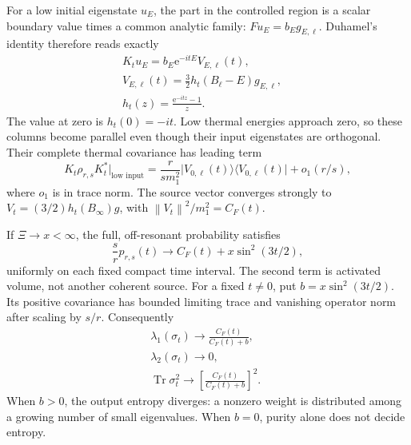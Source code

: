 \documentclass[aps,pra,reprint,superscriptaddress,longbibliography]{revtex4-2}
\newcommand{\Tr}{\operatorname{Tr}}
\newcommand{\ee}{\mathrm e}
\newcommand{\norm}[1]{\left\lVert#1\right\rVert}
\newcommand{\ket}[1]{\lvert#1\rangle}
\newcommand{\bra}[1]{\langle#1\rvert}
\begin{document}
For a low initial eigenstate $u_E$, the part in the controlled region
is a scalar boundary value times a common analytic family:
$Fu_E=b_Eg_{E,\ell}$. Duhamel's identity therefore reads exactly
\begin{equation}
 \begin{gathered}
 K_tu_E=b_E\ee^{-itE}V_{E,\ell}(t),\qquad\\
 V_{E,\ell}(t)=\frac32 h_t(B_\ell-E)g_{E,\ell},\quad\\
 h_t(z)=\frac{\ee^{-itz}-1}{z}.                 \label{eq:column}
 \end{gathered}
\end{equation}
The value at zero is $h_t(0)=-it$. Low thermal energies approach zero,
so these columns become parallel even though their input eigenstates
are orthogonal. Their complete thermal covariance has leading term
\begin{equation}
 K_t\rho_{r,s}K_t^*\big|_{\text{low input}}
 =\frac r{s m_1^2}\ket{V_{0,\ell}(t)}\bra{V_{0,\ell}(t)}
                       +o_1(r/s),                            \label{eq:covariance}
\end{equation}
where $o_1$ is in trace norm. The source vector converges strongly to
$V_t=(3/2)h_t(B_\infty)g$, with
$\norm{V_t}^2/m_1^2=C_F(t)$.

If $\Xi\to x<\infty$, the full, off-resonant probability satisfies
\begin{equation}
 \frac{s}{r}p_{r,s}(t)\longrightarrow
       C_F(t)+x\sin^2(3t/2),                                  \label{eq:timeyield}
\end{equation}
uniformly on each fixed compact time interval. The second term is
activated volume, not another coherent source. For a fixed $t\ne0$,
put $b=x\sin^2(3t/2)$. Its positive covariance has bounded limiting
trace and vanishing operator norm after scaling by $s/r$. Consequently
\begin{equation}
 \begin{gathered}
 \lambda_1(\sigma_t)\to\frac{C_F(t)}{C_F(t)+b},\quad\\
 \lambda_2(\sigma_t)\to0,\quad\\
 \Tr\sigma_t^2\to\left[\frac{C_F(t)}{C_F(t)+b}\right]^2.
                                                               \label{eq:puritylimit}
 \end{gathered}
\end{equation}
When $b>0$, the output entropy diverges: a nonzero weight is distributed
among a growing number of small eigenvalues. When $b=0$, purity alone
does not decide entropy.
\end{document}
